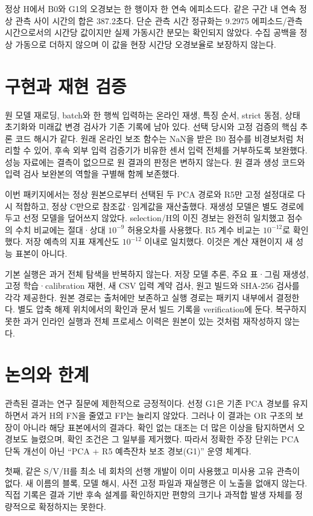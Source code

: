 \documentclass{article}
\begin{document}
정상 H에서 B0와 G1의 오경보는 한 행이자 한 연속 에피소드다. 같은 구간 내 연속 정상 관측 사이 시간의 합은 387.2초다. 단순 관측 시간 정규화는 9.2975 에피소드/관측시간으로서의 시간당 값이지만 실제 가동시간 분모는 확인되지 않았다. 수집 공백을 정상 가동으로 더하지 않으며 이 값을 현장 시간당 오경보율로 보장하지 않는다.

\section{구현과 재현 검증}
원 모델 재로딩, batch와 한 행씩 입력하는 온라인 재생, 특징 순서, strict 동점, 상태 초기화와 미래값 변경 검사가 기존 기록에 남아 있다. 선택 당시와 고정 검증의 핵심 추론 코드 해시가 같다. 원래 온라인 보조 함수는 NaN을 받은 B0 점수를 비경보처럼 처리할 수 있어, 후속 외부 입력 검증기가 비유한 센서 입력 전체를 거부하도록 보완했다. 성능 자료에는 결측이 없으므로 원 결과의 판정은 변하지 않는다. 원 결과 생성 코드와 입력 검사 보완본의 역할을 구별해 함께 보존했다.

이번 패키지에서는 정상 원본으로부터 선택된 두 PCA 경로와 R5만 고정 설정대로 다시 적합하고, 정상 C만으로 참조값·임계값을 재산출했다. 재생성 모델은 별도 경로에 두고 선정 모델을 덮어쓰지 않았다. selection/H의 이진 경보는 완전히 일치했고 점수의 수치 비교에는 절대·상대 $10^{-9}$ 허용오차를 사용했다. R5 계수 비교는 $10^{-12}$로 확인했다. 저장 예측의 지표 재계산도 $10^{-12}$ 이내로 일치했다. 이것은 계산 재현이지 새 성능 표본이 아니다.

기본 실행은 과거 전체 탐색을 반복하지 않는다. 저장 모델 추론, 주요 표·그림 재생성, 고정 학습·calibration 재현, 새 CSV 입력 계약 검사, 원고 빌드와 SHA-256 검사를 각각 제공한다. 원본 경로는 출처에만 보존하고 실행 경로는 패키지 내부에서 결정한다. 별도 압축 해제 위치에서의 확인과 문서 빌드 기록을 verification에 둔다. 복구하지 못한 과거 인라인 실행과 전체 프로세스 이력은 원본이 있는 것처럼 재작성하지 않는다.

\section{논의와 한계}
관측된 결과는 연구 질문에 제한적으로 긍정적이다. 선정 G1은 기존 PCA 경보를 유지하면서 과거 H의 FN을 줄였고 FP는 늘리지 않았다. 그러나 이 결과는 OR 구조의 보장이 아니라 해당 표본에서의 결과다. 확인 없는 대조는 더 많은 이상을 탐지하면서 오경보도 늘렸으며, 확인 조건은 그 일부를 제거했다. 따라서 정확한 주장 단위는 PCA 단독 개선이 아닌 ``PCA + R5 예측잔차 보조 경보(G1)'' 운영 체계다.

첫째, 같은 S/V/H를 최소 네 회차의 선행 개발이 이미 사용했고 미사용 고유 관측이 없다. 새 이름의 블록, 모델 해시, 사전 고정 파일과 재실행은 이 노출을 없애지 않는다. 직접 기록은 결과 기반 후속 설계를 확인하지만 편향의 크기나 과적합 발생 자체를 정량적으로 확정하지는 못한다.
\end{document}
